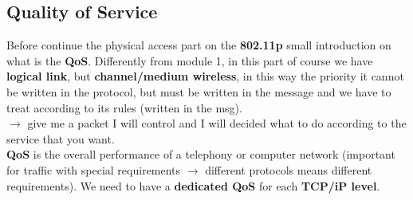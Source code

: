 \subsection{Quality of Service}
Before continue the physical access part on the \textbf{802.11p} small introduction on what is the \textbf{QoS}. Differently from module 1, in this part of course we have \textbf{logical link}, but \textbf{channel/medium wireless}, in this way the priority it cannot be written in the protocol, but must be written in the message and we have to treat according to its rules (written in the msg). \\
$\rightarrow$ give me a packet I will control and I will decided what to do according to the service that you want. \\ \newline
\textbf{QoS} is the overall performance of a telephony or computer network (important for traffic with special requirements $\rightarrow$ different protocols means different requirements). We need to have a \textbf{dedicated QoS} for each \textbf{TCP/iP level}. 
